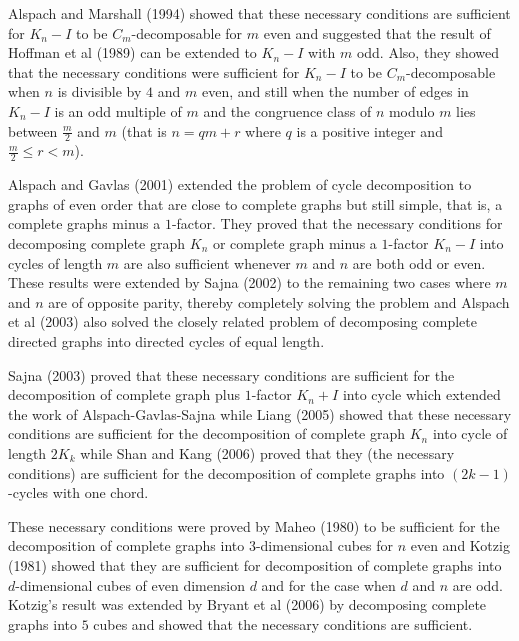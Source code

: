 \documentclass[12pt]{report}
\begin{document}
 Alspach and Marshall (1994) %
  showed that these necessary
 conditions are sufficient for $K_n-I$ to be $C_m$-decomposable for
 $m$ even
 and suggested that the result of Hoffman et al (1989) %
   can be extended to $K_n-I$ with $m$ odd. Also, they showed that the necessary conditions were sufficient for $K_n-I$ to be $C_m$-decomposable when $n$ is divisible by $4$ and $m$
 even,
 and still when the number of edges in $K_n-I$ is an odd multiple of $m$ and the congruence class of $n$ modulo $m$ lies between $\frac{m}{2}$ and $m$ (that is $n=qm+r$ where $q$ is a positive integer and $\frac{m}{2}\leq r <m$).

Alspach and Gavlas (2001) %
   extended the problem of cycle decomposition to graphs of even order that are close to complete graphs but still simple, that is, a complete graphs minus a $1$-factor. They proved that the necessary conditions for decomposing complete graph $K_n$ or complete graph minus a $1$-factor $K_n-I$ into cycles of length $m$ are also sufficient whenever $m$ and $n$ are both odd or even. These results were extended by
 Sajna (2002) %
   to the remaining two cases where $m$ and $n$  are of opposite parity, thereby completely solving the problem and Alspach et al (2003) %
 also solved the closely related problem of decomposing complete directed graphs into directed cycles of equal length.

Sajna (2003) %
proved that these necessary conditions are sufficient for the
decomposition of complete graph plus $1$-factor $K_n+I$ into cycle
which extended  the work of
Alspach-Gavlas-Sajna while Liang (2005) %
showed that these necessary conditions are sufficient for the
decomposition of complete graph $K_n$ into cycle of length $2K_k$
while
Shan and Kang (2006) %
 proved that they (the necessary conditions) are sufficient for the decomposition of complete graphs into $(2k-1)$-cycles with one chord.

 These necessary conditions were proved by Maheo (1980) to be sufficient for the decomposition of complete graphs into $3$-dimensional cubes for $n$ even and Kotzig (1981) %
showed that they are sufficient for decomposition of complete graphs into $d$-dimensional cubes of even dimension $d$ and for the case when $d$ and $n$ are odd. Kotzig's result was extended by Bryant et al (2006) %
 by decomposing complete graphs into $5$ cubes
 and showed that the necessary conditions are sufficient.
\end{document}
